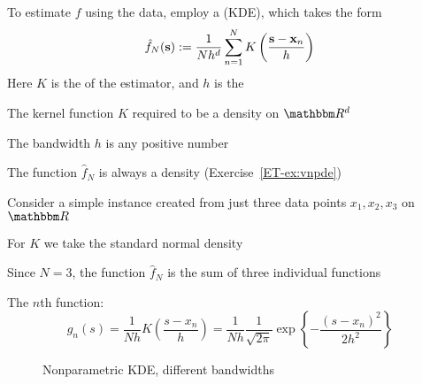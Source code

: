 \begin{frame}

    \vspace{2em}
    To estimate $f$ using the data, employ
    a  (KDE), which takes the form
    \begin{equation}
        \label{eq:npkde}
        \hat f_N({\mathbf s}) 
        := \frac{1}{N h^d} \sum_{n=1}^N 
            K \left( \frac{{\mathbf s} - {\mathbf x}_n}{h} \right)
    \end{equation}
    Here $K$ is the  of the estimator, and
    $h$ is the 
    
    \vspace{.7em}
    The kernel function $K$ required
    to be a density on $\RR^d$ 
    
    The bandwidth
    $h$ is any positive number
    
    The function $\hat f_N$ is always a
    density (Exercise~\ref{ET-ex:vnpde})
    
\end{frame}

\begin{frame}

    \vspace{2em}
    Consider a simple instance created from just three data points $x_1, x_2, x_3$ on
    $\RR$
    
    \vspace{.7em}
    For $K$ we take the standard normal density
    
    Since $N=3$, the
    function $\hat f_N$ is the sum of three individual functions
    
    The
    $n$th function:
    \begin{equation*}
        g_n(s) 
            = \frac{1}{N h} 
            K \left( \frac{s - x_n}{h} \right)
            = 
            \frac{1}{N h}
            \frac{1}{\sqrt{2 \pi} }
               \exp 
               \left\{ 
                   - \frac{(s - x_n)^2}{2 h^2} 
               \right\} 
    \end{equation*}
    
\end{frame}

\begin{frame}

    \begin{figure}
    \centering
    \caption{\label{f:npkde} Nonparametric KDE, different bandwidths}
    \end{figure}
    
\end{frame}

